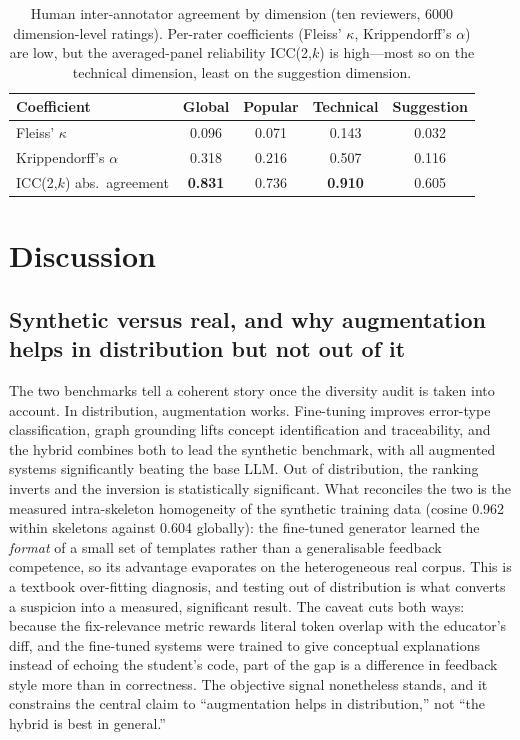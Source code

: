 \documentclass[sageh]{sagej}
\begin{document}
\begin{table}[t]
\centering
\caption{Human inter-annotator agreement by dimension (ten reviewers, 6000 dimension-level ratings). Per-rater coefficients (Fleiss' $\kappa$, Krippendorff's $\alpha$) are low, but the averaged-panel reliability ICC(2,$k$) is high---most so on the technical dimension, least on the suggestion dimension.\label{tab:agreement}}
\begin{tabular}{@{}lcccc@{}}
\toprule
Coefficient & Global & Popular & Technical & Suggestion \\
\midrule
Fleiss' $\kappa$              & 0.096 & 0.071 & 0.143 & 0.032 \\
Krippendorff's $\alpha$       & 0.318 & 0.216 & 0.507 & 0.116 \\
ICC(2,$k$) abs.\ agreement    & \textbf{0.831} & 0.736 & \textbf{0.910} & 0.605 \\
\bottomrule
\end{tabular}
\end{table}

\section{Discussion}

\subsection{Synthetic versus real, and why augmentation helps in distribution but not out of it}
The two benchmarks tell a coherent story once the diversity audit is taken into account. In distribution, augmentation works. Fine-tuning improves error-type classification, graph grounding lifts concept identification and traceability, and the hybrid combines both to lead the synthetic benchmark, with all augmented systems significantly beating the base LLM. Out of distribution, the ranking inverts and the inversion is statistically significant. What reconciles the two is the measured intra-skeleton homogeneity of the synthetic training data (cosine 0.962 within skeletons against 0.604 globally): the fine-tuned generator learned the \emph{format} of a small set of templates rather than a generalisable feedback competence, so its advantage evaporates on the heterogeneous real corpus. This is a textbook over-fitting diagnosis, and testing out of distribution is what converts a suspicion into a measured, significant result. The caveat cuts both ways: because the fix-relevance metric rewards literal token overlap with the educator's diff, and the fine-tuned systems were trained to give conceptual explanations instead of echoing the student's code, part of the gap is a difference in feedback style more than in correctness. The objective signal nonetheless stands, and it constrains the central claim to ``augmentation helps in distribution,'' not ``the hybrid is best in general.''
\end{document}
